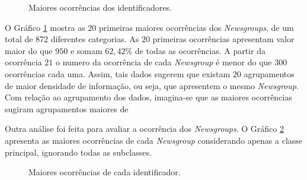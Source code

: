 \documentclass[conference]{IEEEtran}
\begin{document}
\begin{figure}[!h]
	\centering
	{
	}
	\caption{\small Maiores ocorrências dos identificadores.}
	\label{fig:occurrence}
\end{figure}

O Gráfico \ref{fig:occurrence} mostra as $20$ primeiras maiores ocorrências dos \emph{Newsgroups}, de um total de 872 diferentes categorias. As $20$ primeiras ocorrências apresentam valor maior do que $950$ e somam $62,42\%$ de todas as ocorrências. A partir da ocorrência $21$ o numero da ocorrência de cada \emph{Newsgroup} é menor do que $300$ ocorrências cada uma. Assim, tais dados sugerem que existam $20$ agrupamentos de maior densidade de informação, ou seja, que apresentem o mesmo \emph{Newsgroup}. Com relação ao agrupamento dos dados, imagina-se que as maiores ocorrências sugiram agrupamentos maiores de

Outra análise foi feita para avaliar a ocorrência dos \emph{Newsgroups}. O Gráfico \ref{fig:occurrence_word} apresenta as maiores ocorrências de cada \emph{Newsgroup} considerando apenas a classe principal, ignorando todas as subclasses.

\begin{figure}[!h]
	\centering
	{
	}
	\caption{\small Maiores ocorrências de cada identificador.}
	\label{fig:occurrence_word}
\end{figure}
\end{document}
